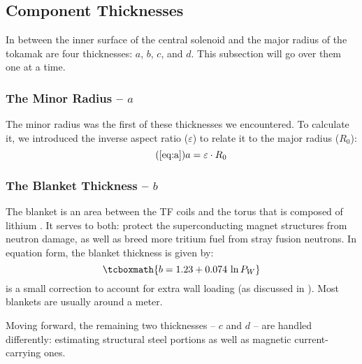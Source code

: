 \subsection{ Component Thicknesses}

In between the inner surface of the central solenoid and the major radius of the tokamak are four thicknesses: $a$, $b$, $c$, and $d$. This subsection will go over them one at a time.

\subsubsection{The Minor Radius -- $a$}

The minor radius was the first of these thicknesses we encountered. To calculate it, we introduced the inverse aspect ratio ($\varepsilon$) to relate it to the major radius ($R_0$):
\begin{equation}
	\tag{\ref{eq:a}}
	a = \varepsilon \cdot R_0
\end{equation}

\subsubsection{The Blanket Thickness -- $b$}

The blanket is an area between the TF coils and the torus that is composed  of lithium . It serves to both: protect the superconducting magnet structures from neutron damage, as well as breed more tritium fuel from stray fusion neutrons.\cite{blanket} In equation form, the blanket thickness is given by: \cite{minervini}
\begin{equation}
	\label{eq:bb}
	\tcboxmath{
	b = 1.23 + 0.074 \ \textnormal{ln} \, P_W
	}
\end{equation}
 is a small correction to account for extra wall loading (as discussed in ). Most blankets are usually around a meter.\cite{minervini,arc}

Moving forward, the remaining two thicknesses -- $c$ and $d$ -- are handled differently: estimating structural steel portions as well as magnetic current-carrying ones.

